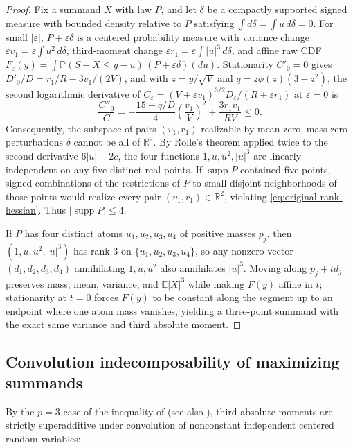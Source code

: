 \documentclass[11pt]{article}
\numberwithin{equation}{section}
\theoremstyle{definition}
\DeclareMathOperator{\supp}{supp}
\newcommand{\E}{\mathbb E}
\newcommand{\Pp}{\mathbb P}
\newcommand{\R}{\mathbb R}
\newcommand{\eps}{\varepsilon}
\begin{document}
\begin{proof}
Fix a summand $X$ with law $P$, and let $\delta$ be a compactly supported
signed measure with bounded density relative to $P$ satisfying
$\int d\delta=\int u\,d\delta=0$. For small $|\eps|$, $P+\eps\delta$ is a
centered probability measure with variance change $\eps v_1=\eps\int u^2\,d\delta$,
third-moment change $\eps r_1=\eps\int|u|^3\,d\delta$, and affine raw CDF
$F_\eps(y)=\int\Pp(S-X\le y-u)\,(P+\eps\delta)(du)$. Stationarity $C'_0=0$
gives $D'_0/D=r_1/R-3v_1/(2V)$, and with $z=y/\sqrt V$ and
$q=z\phi(z)(3-z^2)$, the second logarithmic derivative of
$C_\eps=(V+\eps v_1)^{3/2}D_\eps/(R+\eps r_1)$ at $\eps=0$ is
\begin{equation}\label{eq:original-rank-hessian}
 \frac{C''_0}{C}=-\frac{15+q/D}{4}\left(\frac{v_1}{V}\right)^2
                       +\frac{3r_1v_1}{RV}\le0.
\end{equation}
Consequently, the subspace of pairs $(v_1,r_1)$ realizable by mean-zero,
mass-zero perturbations $\delta$ cannot be all of $\R^2$. By Rolle's theorem
applied twice to the second derivative $6|u|-2c$, the four functions
$1,u,u^2,|u|^3$ are linearly independent on any five distinct real points.
If $\supp P$ contained five points, signed combinations of the restrictions
of $P$ to small disjoint neighborhoods of those points would realize every
pair $(v_1,r_1)\in\R^2$, violating \eqref{eq:original-rank-hessian}. Thus
$|\supp P|\le4$.

If $P$ has four distinct atoms $u_1,u_2,u_3,u_4$ of positive masses $p_j$,
then $(1,u,u^2,|u|^3)$ has rank $3$ on $\{u_1,u_2,u_3,u_4\}$, so any nonzero
vector $(d_1,d_2,d_3,d_4)$ annihilating $1,u,u^2$ also annihilates $|u|^3$.
Moving along $p_j+td_j$ preserves mass, mean, variance, and $\E|X|^3$ while
making $F(y)$ affine in $t$; stationarity at $t=0$ forces $F(y)$ to be
constant along the segment up to an endpoint where one atom mass vanishes,
yielding a three-point summand with the exact same variance and third
absolute moment.
\end{proof}

\subsection{Convolution indecomposability of maximizing summands}

By the $p=3$ case of the inequality of \citet[Theorem~(2.6)]{CoxKemperman1983}
(see also \citet[Theorem~E and Sections~2.1--2.2]{Ruzankin2014}), third
absolute moments are strictly superadditive under convolution of nonconstant
independent centered random variables:
\end{document}
